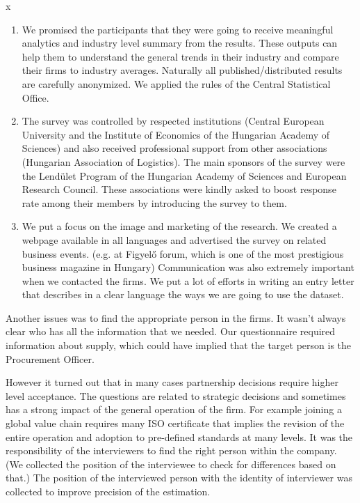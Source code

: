 x\documentclass[final, dvipsnames, authoryear,12pt]{elsarticle}
\begin{document}
\begin{enumerate}
    \item  We promised the participants that they were going to receive meaningful analytics and industry level summary from the results. These outputs can help them to understand the general trends in their industry and compare their firms to industry averages. Naturally all published/distributed results are carefully anonymized. We applied the rules of the Central Statistical Office.

    \item  The survey was controlled by respected institutions (Central European University and the Institute of Economics of the Hungarian Academy of Sciences) and also received professional support from other associations (Hungarian Association of Logistics). The main sponsors of the survey were the Lendület Program of the Hungarian Academy of Sciences and European Research Council. These associations were kindly asked to boost response rate among their members by introducing the survey to them.

    \item  We put a focus on the image and marketing of the research. We created a webpage available in all languages and advertised the survey on related business events. (e.g. at Figyelő forum, which is one of the most prestigious business magazine in Hungary) Communication was also extremely important when we contacted the firms. We put a lot of efforts in writing an entry letter that describes in a clear language the ways we are going to use the dataset.

\end{enumerate}


Another issues was to find the appropriate person in the firms. It wasn’t always clear who has all the information that we needed. Our questionnaire required information about supply, which could have implied that the target person is the Procurement Officer. 

However it turned out that in many cases partnership decisions require higher level acceptance. The questions are related to strategic decisions and sometimes has a strong impact of the general operation of the firm. For example joining a global value chain requires many ISO certificate that implies the revision of the entire operation and adoption to pre-defined standards at many levels. It was the responsibility of the interviewers to find the right person within the company. (We collected the position of the interviewee to check for differences based on that.) The position of the interviewed person with the identity of interviewer was collected to improve precision of the estimation.
\end{document}
